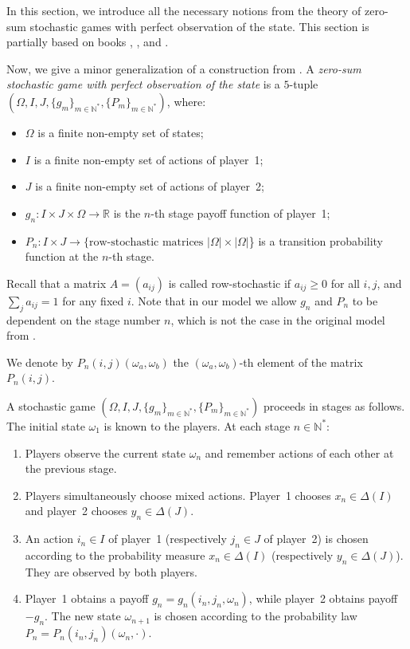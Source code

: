 \documentclass[english,openary,12pt]{article}
\theoremstyle{definition}
\newcommand{\R}{\mathbb{R}}
\newcommand{\N}{\mathbb{N}}
\begin{document}
In this section, we introduce all the necessary notions from the theory of  zero-sum stochastic games with perfect observation of the state. This section is partially based on books \cite{MerSorZam15}, \cite{LarRenSor19}, and \cite{Sor02}. 

Now, we give a minor generalization of a construction from \cite{Sha53}. A \emph{zero-sum stochastic game with perfect observation of the state} is a $5$-tuple 
$(\Omega, I, J, \{g_m\}_{m\in\N^*}, \{P_m\}_{m\in\N^*})$, where: 
\begin{itemize}
	\item $\Omega$ is a finite non-empty set of states;
	\item $I$ is a finite non-empty set of actions of player~1; 
	\item $J$ is a finite non-empty set of actions of player~2;
	\item $g_n : I \times J \times \Omega \to \R$ is the $n$-th stage payoff 
	function of player~1;
	\item $P_n : I \times J \to 
\{\text{row-stochastic matrices } |\Omega| \times |\Omega|$\} is a 
transition probability function at the $n$-th stage.
\end{itemize}

Recall that a matrix $A = (a_{i j})$ is called row-stochastic if $a_{i j} \ge 0$ for all $i, j$, and $\sum_{j} a_{i j} = 1$ for any fixed $i$.
Note that in our model we allow $g_n$ and $P_n$ to be dependent on the stage number $n$, which is not the case in the original model from \cite{Sha53}. 

We denote by $P_n (i,j) (\omega_a, \omega_b)$ the $(\omega_a,\omega_b)$-th element of the matrix $P_n (i,j)$.


A stochastic game $(\Omega, I, J, \{g_m\}_{m\in\N^*}, \{P_m\}_{m\in\N^*})$ proceeds in stages as follows. The initial state $\omega_1$ is known to the players. At each stage $n \in \N^*$:
\begin{enumerate}
	\item Players observe the current state $\omega_n$ and remember actions of each other at the previous stage.
	\item Players simultaneously choose mixed actions. Player~1 chooses $x_n \in \Delta(I)$ and player~2 chooses $y_n \in \Delta(J)$.
	\item An action $i_n \in I$ of player~1 (respectively $j_n \in J$ of player~2) is chosen according to the probability measure $x_n \in \Delta(I)$ (respectively $y_n \in \Delta(J)$). They are observed by both players.
	\item Player~1 obtains a payoff $g_n = g_n(i_n, j_n, \omega_n)$, while player~2 obtains payoff $-g_n$. The new state $\omega_{n+1}$ is chosen according to the probability law $P_n = P_n(i_n, j_n)(\omega_n, \cdot)$.
\end{enumerate}
\end{document}
